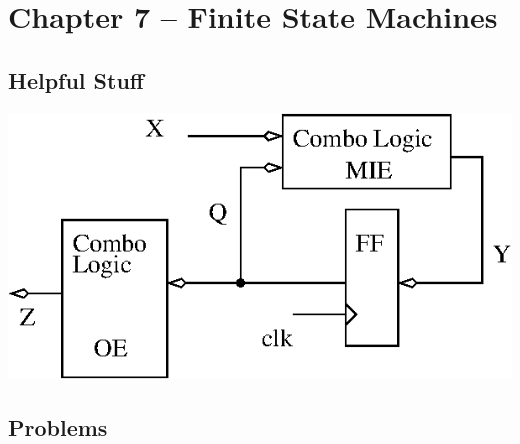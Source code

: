 \section{Chapter 7 -- Finite State Machines}
\subsection{Helpful Stuff}

\includegraphics{./Fig7/GenFSM}





\subsection{Problems}

